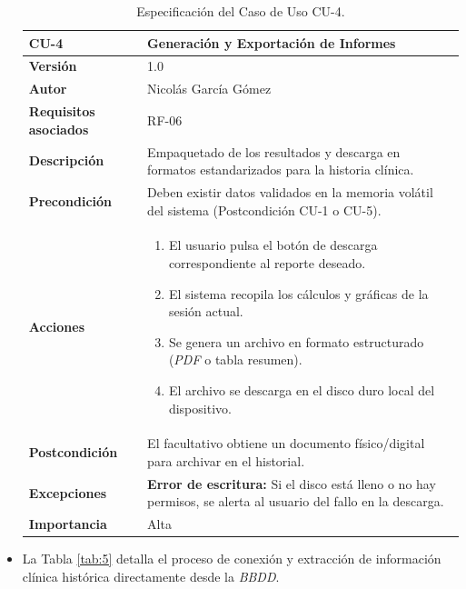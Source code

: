 \begin{itemize}
\begin{table}[hbt!]	\centering
	\begin{tabularx}{\linewidth}{ p{} p{} }
		\toprule
		\textbf{CU-4}    & \textbf{Generación y Exportación de Informes}\\
		\toprule
		\textbf{Versión}              & 1.0    \\
		\textbf{Autor}                & Nicolás García Gómez \\
		\textbf{Requisitos asociados} & RF-06 \\
		\textbf{Descripción}          & Empaquetado de los resultados y descarga en formatos estandarizados para la historia clínica. \\
		\textbf{Precondición}         & Deben existir datos validados en la memoria volátil del sistema (Postcondición CU-1 o CU-5). \\
		\textbf{Acciones}             &
		\begin{enumerate}
			\def\labelenumi{\arabic{enumi}.}
			\item El usuario pulsa el botón de descarga correspondiente al reporte deseado.
			\item El sistema recopila los cálculos y gráficas de la sesión actual.
			\item Se genera un archivo en formato estructurado (\textit{PDF} o tabla resumen).
			\item El archivo se descarga en el disco duro local del dispositivo.
		\end{enumerate}\\
		\textbf{Postcondición}        & El facultativo obtiene un documento físico/digital para archivar en el historial. \\
		\textbf{Excepciones}          & \textbf{Error de escritura:} Si el disco está lleno o no hay permisos, se alerta al usuario del fallo en la descarga. \\
		\textbf{Importancia}          & Alta \\
		\bottomrule
	\end{tabularx}
	\caption{Especificación del Caso de Uso CU-4.}
	\label{tab:4}
\end{table}

\item La Tabla \ref{tab:5} detalla el proceso de conexión y extracción de información clínica histórica directamente desde la \textit{BBDD}.
	

\end{itemize}
